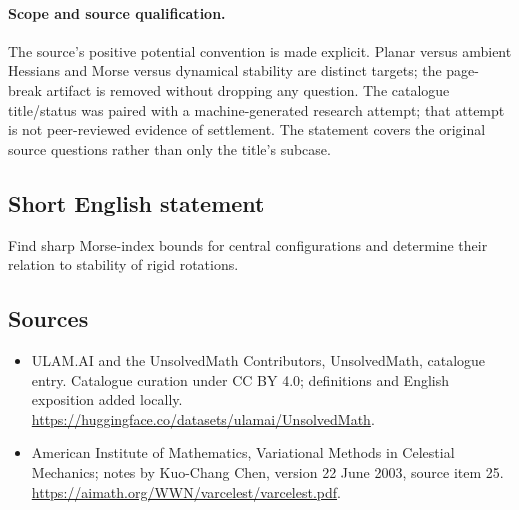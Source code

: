 \documentclass[11pt]{article}
\begin{document}
\paragraph{Scope and source qualification.}The source’s positive potential convention is made explicit. Planar versus ambient Hessians and Morse versus dynamical stability are distinct targets; the page-break artifact is removed without dropping any question. The catalogue title/status was paired with a machine-generated research attempt; that attempt is not peer-reviewed evidence of settlement. The statement covers the original source questions rather than only the title’s subcase.
\subsection{Short English statement}
Find sharp Morse-index bounds for central configurations and determine their relation to stability of rigid rotations.
\subsection{Sources}
\begin{itemize}
\item[\hypertarget{source:statement:1}{S1}] ULAM.AI and the UnsolvedMath Contributors, UnsolvedMath, catalogue entry. Catalogue curation under CC BY 4.0; definitions and English exposition added locally.
\url{https://huggingface.co/datasets/ulamai/UnsolvedMath}.
\item[\hypertarget{source:statement:2}{S2}] American Institute of Mathematics, Variational Methods in Celestial Mechanics; notes by Kuo-Chang Chen, version 22 June 2003, source item 25.
\url{https://aimath.org/WWN/varcelest/varcelest.pdf}.
\end{itemize}
\label{end:statement}
\end{document}
